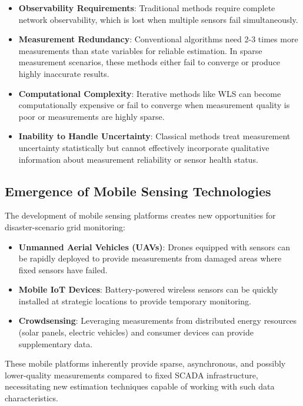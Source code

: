 \documentclass[12pt,a4paper]{report}
\begin{document}
\begin{itemize}
    \item \textbf{Observability Requirements}: Traditional methods require complete network observability, which is lost when multiple sensors fail simultaneously.
    \item \textbf{Measurement Redundancy}: Conventional algorithms need 2-3 times more measurements than state variables for reliable estimation. In sparse measurement scenarios, these methods either fail to converge or produce highly inaccurate results.
    \item \textbf{Computational Complexity}: Iterative methods like WLS can become computationally expensive or fail to converge when measurement quality is poor or measurements are highly sparse.
    \item \textbf{Inability to Handle Uncertainty}: Classical methods treat measurement uncertainty statistically but cannot effectively incorporate qualitative information about measurement reliability or sensor health status.
\end{itemize}

\subsection{Emergence of Mobile Sensing Technologies}

The development of mobile sensing platforms creates new opportunities for disaster-scenario grid monitoring:

\begin{itemize}
    \item \textbf{Unmanned Aerial Vehicles (UAVs)}: Drones equipped with sensors can be rapidly deployed to provide measurements from damaged areas where fixed sensors have failed.
    \item \textbf{Mobile IoT Devices}: Battery-powered wireless sensors can be quickly installed at strategic locations to provide temporary monitoring.
    \item \textbf{Crowdsensing}: Leveraging measurements from distributed energy resources (solar panels, electric vehicles) and consumer devices can provide supplementary data.
\end{itemize}

These mobile platforms inherently provide sparse, asynchronous, and possibly lower-quality measurements compared to fixed SCADA infrastructure, necessitating new estimation techniques capable of working with such data characteristics.
\end{document}
